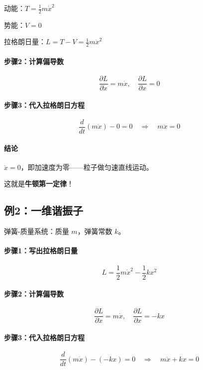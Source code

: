 动能：$T = \frac{1}{2}m\dot{x}^2$

势能：$V = 0$

拉格朗日量：$L = T - V = \frac{1}{2}m\dot{x}^2$

\paragraph{步骤2：计算偏导数}

\[
\frac{\partial L}{\partial \dot{x}} = m\dot{x}, \quad \frac{\partial L}{\partial x} = 0
\]

\paragraph{步骤3：代入拉格朗日方程}

\[
\frac{d}{dt}(m\dot{x}) - 0 = 0 \quad \Rightarrow \quad m\ddot{x} = 0
\]

\paragraph{结论}

$\ddot{x} = 0$，即加速度为零——粒子做匀速直线运动。

这就是\textbf{牛顿第一定律}！

\subsection{例2：一维谐振子}

弹簧-质量系统：质量 $m$，弹簧常数 $k$。

\paragraph{步骤1：写出拉格朗日量}

\[
L = \frac{1}{2}m\dot{x}^2 - \frac{1}{2}kx^2
\]

\paragraph{步骤2：计算偏导数}

\[
\frac{\partial L}{\partial \dot{x}} = m\dot{x}, \quad \frac{\partial L}{\partial x} = -kx
\]

\paragraph{步骤3：代入拉格朗日方程}

\[
\frac{d}{dt}(m\dot{x}) - (-kx) = 0 \quad \Rightarrow \quad m\ddot{x} + kx = 0
\]

